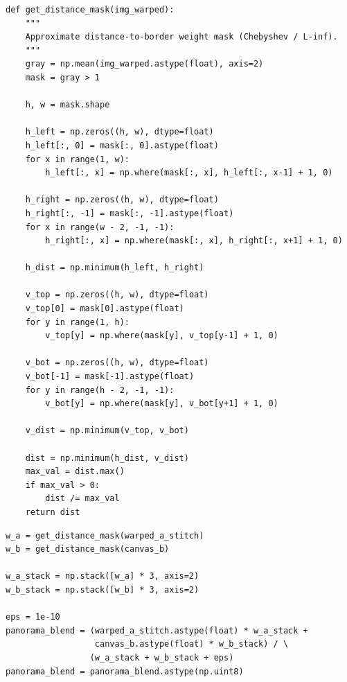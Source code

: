 \documentclass[12pt,a4paper]{article}
\begin{document}
\begin{lstlisting}[caption={Máscara de distância manual para blend ponderado.}]
def get_distance_mask(img_warped):
    """
    Approximate distance-to-border weight mask (Chebyshev / L-inf).
    """
    gray = np.mean(img_warped.astype(float), axis=2)
    mask = gray > 1

    h, w = mask.shape

    h_left = np.zeros((h, w), dtype=float)
    h_left[:, 0] = mask[:, 0].astype(float)
    for x in range(1, w):
        h_left[:, x] = np.where(mask[:, x], h_left[:, x-1] + 1, 0)

    h_right = np.zeros((h, w), dtype=float)
    h_right[:, -1] = mask[:, -1].astype(float)
    for x in range(w - 2, -1, -1):
        h_right[:, x] = np.where(mask[:, x], h_right[:, x+1] + 1, 0)

    h_dist = np.minimum(h_left, h_right)

    v_top = np.zeros((h, w), dtype=float)
    v_top[0] = mask[0].astype(float)
    for y in range(1, h):
        v_top[y] = np.where(mask[y], v_top[y-1] + 1, 0)

    v_bot = np.zeros((h, w), dtype=float)
    v_bot[-1] = mask[-1].astype(float)
    for y in range(h - 2, -1, -1):
        v_bot[y] = np.where(mask[y], v_bot[y+1] + 1, 0)

    v_dist = np.minimum(v_top, v_bot)

    dist = np.minimum(h_dist, v_dist)
    max_val = dist.max()
    if max_val > 0:
        dist /= max_val
    return dist
\end{lstlisting}

\begin{lstlisting}[caption={Aplicação do blend ponderado por distância.}]
w_a = get_distance_mask(warped_a_stitch)
w_b = get_distance_mask(canvas_b)

w_a_stack = np.stack([w_a] * 3, axis=2)
w_b_stack = np.stack([w_b] * 3, axis=2)

eps = 1e-10
panorama_blend = (warped_a_stitch.astype(float) * w_a_stack +
                  canvas_b.astype(float) * w_b_stack) / \
                 (w_a_stack + w_b_stack + eps)
panorama_blend = panorama_blend.astype(np.uint8)
\end{lstlisting}
\end{document}
